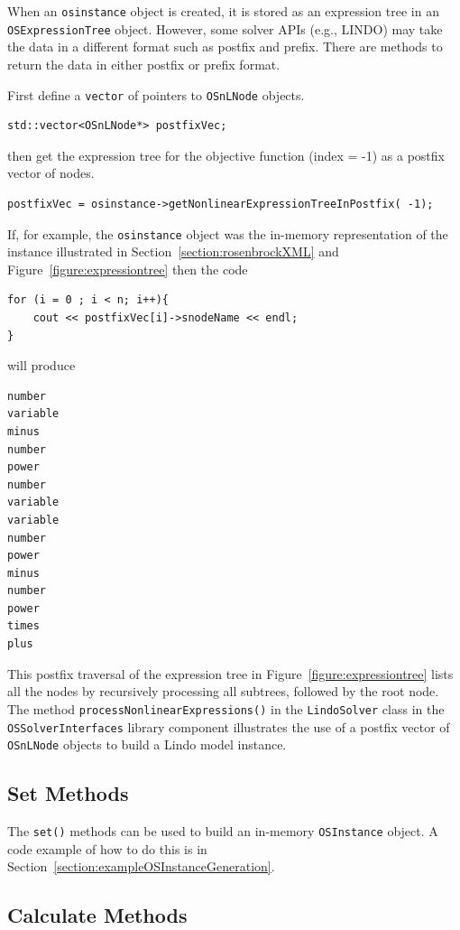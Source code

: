 \documentclass[11pt]{article}
\newcounter{Fig}
\renewcommand{\_}{{\char"5F}}
\renewcommand{\{}{{\char"7B}}
\renewcommand{\}}{{\char"7D}}
\renewcommand{\^}{{\char"0D}}
\renewcommand{\'}{{\char"0D}}
\begin{document}
\begin{enumerate}[Step 1:]
When an {\tt osinstance} object is created, it is stored as an expression tree in an {\tt OSExpressionTree} object. 
However, some solver APIs (e.g., LINDO) may take the data in a different format such as postfix and prefix. 
There are methods to return the data in either postfix or prefix format.

First define a {\tt vector} of pointers to {\tt OSnLNode} objects.
\begin{verbatim}
std::vector<OSnLNode*> postfixVec;
\end{verbatim}
then get the expression tree for the objective function (index = -1) as a postfix vector of nodes.
\begin{verbatim}
postfixVec = osinstance->getNonlinearExpressionTreeInPostfix( -1);
\end{verbatim}
If, for example, the {\tt osinstance} object was the in-memory representation of   the instance illustrated 
in  Section~\ref{section:rosenbrockXML} and Figure~\ref{figure:expressiontree} then the code
\begin{verbatim}
for (i = 0 ; i < n; i++){
    cout << postfixVec[i]->snodeName << endl;
}
\end{verbatim}
will produce
\begin{verbatim}
number
variable
minus
number
power
number
variable
variable
number
power
minus
number
power
times
plus
\end{verbatim}

This postfix traversal of the expression tree in Figure~\ref{figure:expressiontree} lists all the nodes
by recursively processing all subtrees, followed by the root node.
The method {\tt processNonlinearExpressions()} in the {\tt LindoSolver} class in the {\tt OSSolverInterfaces} 
library component illustrates the use of a postfix vector of {\tt OSnLNode} objects to build a Lindo model instance.


\subsection{Set Methods}

The {\tt set()} methods can be used to build an in-memory {\tt OSInstance}
 object. A code example of how to do this is in Section~\ref{section:exampleOSInstanceGeneration}.

\subsection{Calculate Methods}


\end{enumerate}
\end{document}

